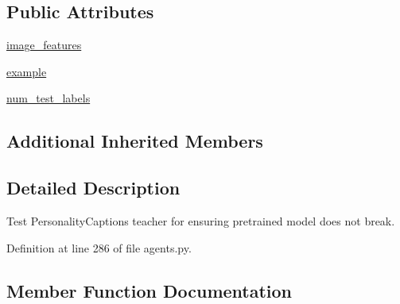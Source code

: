 \subsection*{Public Attributes}
\begin{DoxyCompactItemize}
\item 
\hyperlink{classparlai_1_1tasks_1_1personality__captions_1_1agents_1_1PersonalityCaptionsTestTeacher_a3b99c22797205aaf11f652bd28c314c3}{image\+\_\+features}
\item 
\hyperlink{classparlai_1_1tasks_1_1personality__captions_1_1agents_1_1PersonalityCaptionsTestTeacher_a183b3779c4ce45111f608a263e8147a5}{example}
\item 
\hyperlink{classparlai_1_1tasks_1_1personality__captions_1_1agents_1_1PersonalityCaptionsTestTeacher_aa2232ceb48d0dd2f67e8f15ac0a549e0}{num\+\_\+test\+\_\+labels}
\end{DoxyCompactItemize}
\subsection*{Additional Inherited Members}


\subsection{Detailed Description}
\begin{DoxyVerb}Test PersonalityCaptions teacher for ensuring pretrained model does not break.\end{DoxyVerb}
 

Definition at line 286 of file agents.\+py.



\subsection{Member Function Documentation}
\mbox{\label{classparlai_1_1tasks_1_1personality__captions_1_1agents_1_1PersonalityCaptionsTestTeacher_a07f538c8c1ff16a9d08b78d1ea3ef1f8}} 
